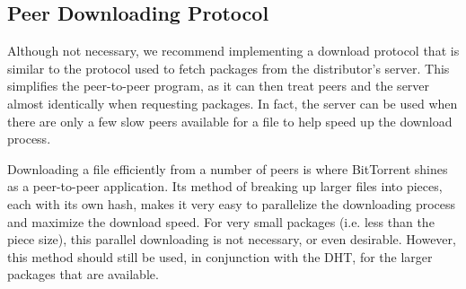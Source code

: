 \documentclass[conference]{IEEEtran}
\begin{document}
%
%

\subsection{Peer Downloading Protocol}
\label{downloading}

Although not necessary, we recommend implementing a download
protocol that is similar to the protocol used to fetch packages from
the distributor's server. This simplifies the peer-to-peer program, as it
can then treat peers and the server almost identically when requesting
packages. In fact, the server can be used when there are only a few
slow peers available for a file to help speed up the download
process.

Downloading a file efficiently from a number of peers is where
BitTorrent shines as a peer-to-peer application. Its method of
breaking up larger files into pieces, each with its own hash,
makes it very easy to parallelize the downloading process and
maximize the download speed. For very small packages (i.e. less than
the piece size), this parallel downloading is not necessary, or
even desirable. However, this method should still be used, in
conjunction with the DHT, for the larger packages that are
available.
\end{document}
